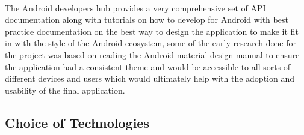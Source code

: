 \\
The Android developers hub provides a very comprehensive set of API documentation along with tutorials on how to develop for Android with best practice documentation on the best way to design the application to make it fit in with the style of the Android ecosystem, some of the early research done for the project was based on reading the Android material design manual to ensure the application had a consistent theme and would be accessible to all sorts of different devices and users which would ultimately help with the adoption and usability of the final application.

\subsection{Choice of Technologies}
\label{sec:android_choice_of_tech}

